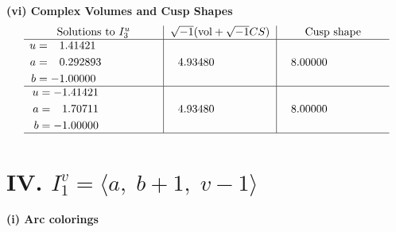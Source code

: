 \documentclass[1p]{elsarticle_modified}
\theoremstyle{definition}
\newcommand{\I}{\sqrt{-1}}
\begin{document}
\newpage\flushleft \textbf{(vi) Complex Volumes and Cusp Shapes}
$$\begin{array}{c|c|c}  
\text{Solutions to }I^u_{3}& \I (\text{vol} + \sqrt{-1}CS) & \text{Cusp shape}\\
 \hline 
\begin{aligned}
u &= \phantom{-}1.41421\phantom{ +0.000000I} \\
a &= \phantom{-}0.292893\phantom{ +0.000000I} \\
b &= -1.00000\phantom{ +0.000000I}\end{aligned}
 & \phantom{-}4.93480\phantom{ +0.000000I} & \phantom{-}8.00000\phantom{ +0.000000I} \\ \hline\begin{aligned}
u &= -1.41421\phantom{ +0.000000I} \\
a &= \phantom{-}1.70711\phantom{ +0.000000I} \\
b &= -1.00000\phantom{ +0.000000I}\end{aligned}
 & \phantom{-}4.93480\phantom{ +0.000000I} & \phantom{-}8.00000\phantom{ +0.000000I}\\
 \hline 
 \end{array}$$\newpage\newpage\renewcommand{\arraystretch}{1}
\centering \section*{IV. $I^v_{1}= \langle a,\;b+1,\;v-1 \rangle$}
\flushleft \textbf{(i) Arc colorings}\\
\end{document}
